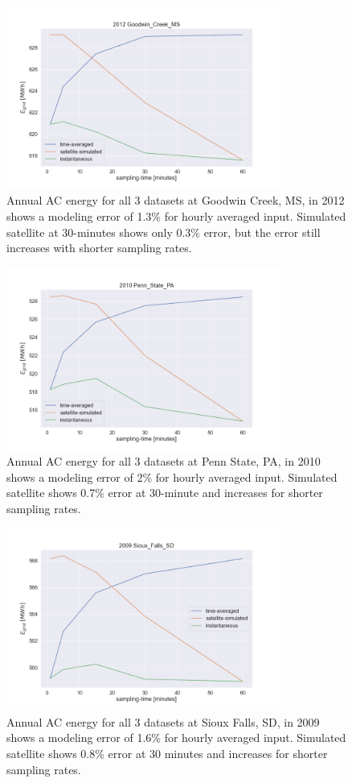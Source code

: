 \documentclass[conference]{IEEEtran}
\begin{document}
\begin{figure}[htbp]
\centerline{\includegraphics[width=9cm]{analysis/gwn2012.png}}
\caption{Annual AC energy for all 3 datasets at Goodwin Creek, MS, in 2012 shows a modeling error of 1.3\% for hourly averaged input. Simulated satellite at 30-minutes shows only 0.3\% error, but the error still increases with shorter sampling rates.}
\label{fig:gwn2012}
\end{figure}

\begin{figure}[htbp]
\centerline{\includegraphics[width=9cm]{analysis/psu2010.png}}
\caption{Annual AC energy for all 3 datasets at Penn State, PA, in 2010 shows a modeling error of 2\% for hourly averaged input. Simulated satellite shows 0.7\% error at 30-minute and increases for shorter sampling rates.}
\label{fig:psu2010}
\end{figure}

\begin{figure}[htbp]
\centerline{\includegraphics[width=9cm]{analysis/sxf2009.png}}
\caption{Annual AC energy for all 3 datasets at Sioux Falls, SD, in 2009 shows a modeling error of 1.6\% for hourly averaged input. Simulated satellite shows 0.8\% error at 30 minutes and increases for shorter sampling rates.}
\label{fig:sxf2009}
\end{figure}
\end{document}
